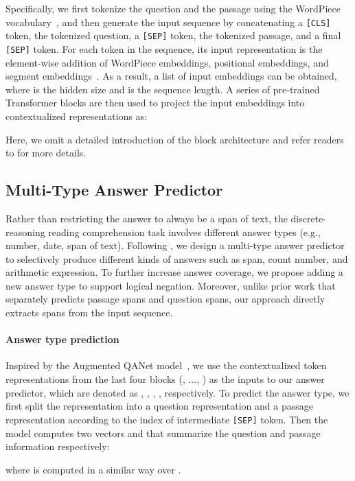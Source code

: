 \documentclass[11pt,a4paper]{article}
\begin{document}
Specifically, we first tokenize the question and the passage using the WordPiece vocabulary~\cite{wu2016google}, and then generate the input sequence by concatenating a \texttt{[CLS]} token, the tokenized question, a \texttt{[SEP]} token, the tokenized passage, and a final \texttt{[SEP]} token.
For each token in the sequence, its input representation is the element-wise addition of WordPiece embeddings, positional embeddings, and segment embeddings~\cite{devlin2018bert}. 
As a result, a list of input embeddings  can be obtained, where  is the hidden size and  is the sequence length. A series of  pre-trained Transformer blocks are then used to project the input embeddings into contextualized representations  as:

Here, we omit a detailed introduction of the block architecture and refer readers to \citet{vaswani2017attention} for more details.


\subsection{Multi-Type Answer Predictor	\label{sec:ans-pred}}
Rather than restricting the answer to always be a span of text, the discrete-reasoning reading comprehension task involves different answer types (e.g., number, date, span of text).
Following \citet{dua2019drop}, we design a multi-type answer predictor to selectively produce different kinds of answers such as span, count number, and arithmetic expression.
To further increase answer coverage, we propose adding a new answer type to support logical negation.
Moreover, unlike prior work that separately predicts passage spans and question spans, our approach directly extracts spans from the input sequence.

\paragraph{Answer type prediction}
Inspired by the Augmented QANet model~\cite{dua2019drop}, we use the contextualized token representations from the last four blocks (, ..., ) as the inputs to our answer predictor, which are denoted as , , , , respectively.
To predict the answer type, we first split the representation  into a question representation  and a passage representation  according to the index of intermediate \texttt{[SEP]} token.
Then the model computes two vectors  and  that summarize the question and passage information respectively:

where  is computed in a similar way over .
\end{document}

